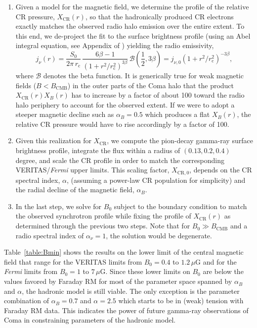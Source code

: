 \documentclass[12pt,manuscript]{aastex}
\newcommand{\rmn}{\mathrm}
\newcommand{\CR}{\mathrm{CR}}
\begin{document}
\begin{enumerate}
\item Given a model for the magnetic field, we determine the profile of the relative CR pressure, $X_{\CR}(r)$, so that the hadronically produced CR electrons exactly matches the observed radio halo emission over the entire extent. To this end, we de-project the fit to the surface brightness profile (using an Abel integral equation, see Appendix of \citealt{article:PfrommerEnsslin:2004b}) yielding the radio emissivity,
\begin{equation}
\label{eq:Coma:radio}
j_{\nu} (r) = \frac{S_{0}}{2\pi\, r_{\rmn{c}}}\,
\frac{6\beta - 1}{\left(1 + r^{2}/r_{\rmn{c}}^{2}\right)^{3 \beta}}\,
\mathcal{B}\left(\frac{1}{2}, 3\beta\right)
= j_{\nu,0} \left(1 + r^2/r_{\rmn{c}}^{2}\right)^{-3 \beta},
\end{equation}
where $\mathcal{B}$ denotes the beta function. It is generically true for weak magnetic fields ($B<B_{\rmn{CMB}}$) in the outer parts of the Coma halo that the product $X_{\CR}(r)X_{B}(r)$ has to increase by a factor of about 100 toward the radio halo periphery to account for the observed extent. If we were to adopt a steeper magnetic decline such as $\alpha_{B}=0.5$ which produces a flat $X_{B}(r)$, the relative CR pressure would have to rise accordingly by a factor of 100.

\item Given this realization for $X_{\CR}$, we compute the pion-decay gamma-ray surface brightness profile, integrate the flux within a radius of $(0.13, 0.2, 0.4)$ degree, and scale the CR profile in order to match the corresponding VERITAS/{\em Fermi} upper limits. This scaling factor, $X_{\CR,0}$, depends on the CR spectral index, $\alpha$, (assuming a power-law CR population for simplicity) and the radial decline of the magnetic field, $\alpha_{B}$.

\item In the last step, we solve for $B_{0}$ subject to the boundary condition to match the observed synchrotron profile while fixing the profile of $X_{\CR}(r)$ as determined through the previous two steps. Note that for $B_{0} \gg B_{\rmn{CMB}}$ and a radio spectral index of $\alpha_{\nu}=1$, the solution would be degenerate.
\end{enumerate}

Table~\ref{table:Bmin} shows the results on the lower limit of the central magnetic field that range for the VERITAS limits from $B_{0} = 0.4$ to $1.2\,\mu$G and for the {\em Fermi} limits from $B_{0} = 1$ to $7\,\mu$G. Since these lower limits on $B_0$ are below the values favored by Faraday RM for most of the parameter space spanned by $\alpha_B$ and $\alpha$, the hadronic model is still viable. The only exception is the parameter combination of $\alpha_B=0.7$ and $\alpha=2.5$ which starts to be in (weak) tension with Faraday RM data. This indicates the power of future gamma-ray observations of Coma in constraining parameters of the hadronic model.
\end{document}
